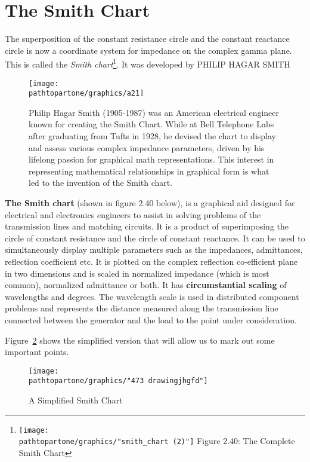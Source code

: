 \section{The Smith Chart}
The superposition of the constant resistance circle and the constant reactance circle is now a coordinate system for impedance on the complex gamma plane. This is called the \emph{Smith chart}\footnote{
\centering
\texttt{[image: \\pathtopartone/graphics/"smith\_chart (2)"]}
\centering
Figure 2.40: The Complete Smith Chart
}. It was developed by PHILIP HAGAR SMITH
\begin{figure}[h]
\texttt{[image: \\pathtopartone/graphics/a21]}


Philip Hagar Smith (1905-1987) was an American electrical engineer known for creating the Smith Chart. While at Bell Telephone Labs after graduating from Tufts in 1928, he devised the chart to display and assess various complex impedance parameters, driven by his lifelong passion for graphical math representations. This interest in representing mathematical relationships in graphical form is what led to the invention of the Smith chart.
\label{fig:smithchart-2}
\end{figure}

\textbf{The Smith chart} (shown in figure 2.40 below), is a graphical aid designed for electrical and electronics engineers to assist in solving problems of the transmission lines and matching circuits. It is a product of superimposing the circle of constant resistance and the circle of constant reactance. It can be used to simultaneously display multiple parameters such as the impedances, admittances, reflection coefficient etc.
It is plotted on the complex reflection co-efficient plane in two dimensions and is scaled in normalized impedance (which is most common), normalized admittance or both. It has \textbf{circumstantial scaling} of wavelengths and degrees. The wavelength scale is used in distributed component problems and represents the distance measured along the transmission line connected between the generator and the load to the point under consideration.

Figure~\ref{fig:473-drawingjhgfd} shows the simplified version that will allow us to mark out some important points.
\begin{figure}[h]
\centering
\texttt{[image: \\pathtopartone/graphics/"473 drawingjhgfd"]}
\caption{A Simplified Smith Chart}
\label{fig:473-drawingjhgfd}
\end{figure}


